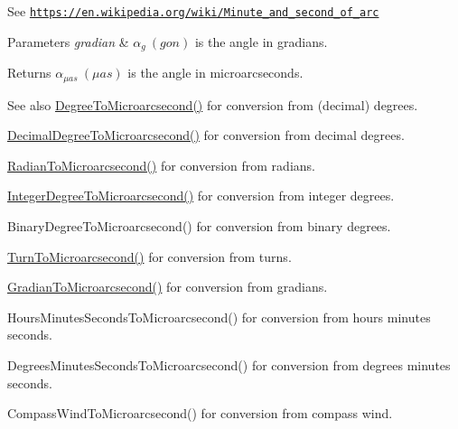 See \href{https://en.wikipedia.org/wiki/Minute_and_second_of_arc}{\tt https\+://en.\+wikipedia.\+org/wiki/\+Minute\+\_\+and\+\_\+second\+\_\+of\+\_\+arc} 
\begin{DoxyParams}{Parameters}
{\em gradian} & $\alpha_{g}\ (gon)$ is the angle in gradians. \\
\hline
\end{DoxyParams}
\begin{DoxyReturn}{Returns}
$\alpha_{\mu as}\ (\mu as)$ is the angle in microarcseconds. 
\end{DoxyReturn}
\begin{DoxySeeAlso}{See also}
\mbox{\hyperlink{group___e_g_x_math-_angle_conversions-_degree_ga31b65388fe1b4656663b3d66b9d764e6}{Degree\+To\+Microarcsecond()}} for conversion from (decimal) degrees. 

\mbox{\hyperlink{group___e_g_x_math-_angle_conversions-_decimal_degree_ga6fa88456069907fd24716fa575517571}{Decimal\+Degree\+To\+Microarcsecond()}} for conversion from decimal degrees. 

\mbox{\hyperlink{group___e_g_x_math-_angle_conversions-_radian_ga3a515ca2838a305fa40750763f546a86}{Radian\+To\+Microarcsecond()}} for conversion from radians. 

\mbox{\hyperlink{group___e_g_x_math-_angle_conversions-_integer_degree_ga69179d6082764595c7014805e1f6b31e}{Integer\+Degree\+To\+Microarcsecond()}} for conversion from integer degrees. 

Binary\+Degree\+To\+Microarcsecond() for conversion from binary degrees. 

\mbox{\hyperlink{group___e_g_x_math-_angle_conversions-_turn_ga41a861a04d65aab05647b32142e6d80d}{Turn\+To\+Microarcsecond()}} for conversion from turns. 

\mbox{\hyperlink{group___e_g_x_math-_angle_conversions-_gradian_gab7781c860ea3ab9c9cf76ab639846a07}{Gradian\+To\+Microarcsecond()}} for conversion from gradians. 

Hours\+Minutes\+Seconds\+To\+Microarcsecond() for conversion from hours minutes seconds. 

Degrees\+Minutes\+Seconds\+To\+Microarcsecond() for conversion from degrees minutes seconds. 

Compass\+Wind\+To\+Microarcsecond() for conversion from compass wind. 
\end{DoxySeeAlso}
\mbox{\label{group___e_g_x_math-_angle_conversions-_gon_ga63013f99af7ec2b9628b8b87eb2e2a92}} 
